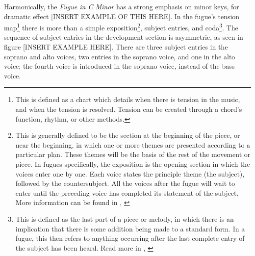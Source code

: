 Harmonically, the \textit{Fugue in C Minor} has a strong emphasis on minor keys, for dramatic effect [INSERT EXAMPLE OF THIS HERE]. In the fugue's tension map\footnote{This is defined as a chart which details when there is tension in the music, and when the tension is resolved. Tension can be created through a chord's function, rhythm, or other methods.} there is more than a simple exposition\footnote{This is generally defined to be the section at the beginning of the piece, or near the beginning, in which one or more themes are presented according to a particular plan. These themes will be the basis of the rest of the movement or piece. In fugues specifically, the exposition is the opening section in which the voices enter one by one. Each voice states the principle theme (the subject), followed by the countersubject. All the voices after the fugue will wait to enter until the preceding voice has completed its statement of the subject. More information can be found in \citeauthor{Walker_2001_Exposition}, \citeyear{Walker_2001_Exposition}}, subject entries, and coda\footnote{This is defined as the last part of a piece or melody, in which there is an implication that there is some addition being made to a standard form. In a fugue, this then refers to anything occurring after the last complete entry of the subject has been heard. Read more in \citeauthor{Bullivant_2001}, \citeyear{Bullivant_2001}}. The sequence of subject entries in the development section is asymmetric, as seen in figure [INSERT EXAMPLE HERE]. There are three subject entries in the soprano and alto voices, two entries in the soprano voice, and one in the alto voice; the fourth voice is introduced in the soprano voice, instead of the bass voice.